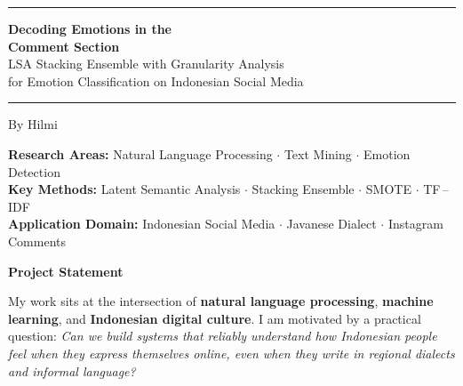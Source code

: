 \documentclass[12pt,a4paper,twoside]{article}
\theoremstyle{definition}
\begin{document}
\begin{titlepage}
\centering
\vspace*{2cm}

{\color{mainblue}\rule{\textwidth}{2pt}}
\vspace{0.5cm}

{\Huge\bfseries\color{mainblue} Decoding Emotions in the\\Comment Section\\[0.3cm]}
{\LARGE\color{darktext} LSA Stacking Ensemble with Granularity Analysis\\for Emotion Classification on Indonesian Social Media}

\vspace{0.5cm}
{\color{mainblue}\rule{\textwidth}{2pt}}

\vspace{1.5cm}

{\Large By Hilmi}

\vspace{2cm}

\begin{flushleft}
\small
\textbf{Research Areas:} Natural Language Processing $\cdot$ Text Mining $\cdot$ Emotion Detection\\[0.3cm]
\textbf{Key Methods:} Latent Semantic Analysis $\cdot$ Stacking Ensemble $\cdot$ SMOTE $\cdot$ TF\,--\,IDF\\[0.3cm]
\textbf{Application Domain:} Indonesian Social Media $\cdot$ Javanese Dialect $\cdot$ Instagram Comments
\end{flushleft}

\vfill

\end{titlepage}

\newpage
\thispagestyle{empty}

\begin{center}
{\Large\bfseries\color{mainblue} Project Statement}
\end{center}

\vspace{0.5cm}

My work sits at the intersection of \textbf{natural language processing}, \textbf{machine learning}, and \textbf{Indonesian digital culture}. I am motivated by a practical question: \textit{Can we build systems that reliably understand how Indonesian people feel when they express themselves online, even when they write in regional dialects and informal language?}
\end{document}
